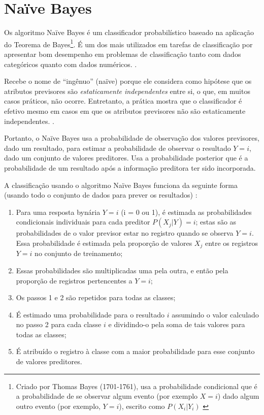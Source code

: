 \section{Naïve Bayes}\label{sec:naive-bayes}
Os algoritmo Naïve Bayes é um classificador probabilístico baseado na aplicação do Teorema de Bayes\footnote{Criado por Thomas Bayes (1701-1761), usa a probabilidade condicional que é a probabilidade de se observar algum evento (por exemplo $X = i$) dado algum outro evento (por exemplo, $Y=i$), escrito como $P(X_i|Y_i)$ \cite{bruce_estatistica_2019}}. É um dos mais utilizados em tarefas de classificação por apresentar bom desempenho em problemas de classificação tanto com dados categóricos quanto com dados numéricos. \cite{Boscarioli2017} \cite{amaral_introducao_2018} \cite{goldschmidt2005} \cite{bruce_estatistica_2019}.

Recebe o nome de ``ingênuo'' (naïve) porque ele considera como hipótese que os atributos previsores são \textit{estaticamente independentes} entre si, o que, em muitos casos práticos, não ocorre. Entretanto, a prática mostra que o classificador é efetivo mesmo em casos em que os atributos previsores não são estaticamente independentes. \cite{Boscarioli2017} \cite{goldschmidt2005} \cite{bruce_estatistica_2019}.

Portanto, o Naïve Bayes usa a probabilidade de observação dos valores previsores, dado um resultado, para estimar a probabilidade de observar o resultado $Y = i $, dado um conjunto de valores preditores. Usa a probabilidade posterior que é a probabilidade de um resultado após a informação preditora ter sido incorporada.

A classificação usando o algoritmo Naïve Bayes funciona da seguinte forma (usando todo o conjunto de dados para prever os resultados) \cite{bruce_estatistica_2019}:
\begin{enumerate}
	\item Para uma resposta bynária $ Y = i$ (i = 0 ou 1), é estimada as probabilidades condicionais individuais para cada preditor $  P(X_j | Y) = i $; estas são as probabilidades de o valor previsor estar no registro quando se observa $ Y = i $. Essa probabilidade é estimada pela proporção de valores $ X_j $ entre os registros $ Y = i $ no conjunto de treinamento;
	\item Essas probabilidades são multiplicadas uma pela outra, e então pela proporção de registros pertencentes a $ Y = i $;
	\item Os passos 1 e 2 são repetidos para todas as classes;
	\item É estimado uma probabilidade para o resultado $ i $ assumindo o valor calculado no passo 2 para cada classe $ i $ e dividindo-o pela soma de tais valores para todas as classes;
	\item É atribuído o registro à classe com a maior probabilidade para esse conjunto de valores preditores.
\end{enumerate}

